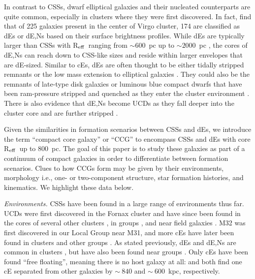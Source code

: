 \documentclass[iop,apj]{emulateapj}
\newcommand{\Reff}{R$_{\rm eff}$}
\begin{document}
In contrast to CSSs, dwarf elliptical galaxies \citep[dEs;][]{Sandage1985} and their nucleated counterparts \citep[dE,Ns;][]{Binggeli1984} are quite common, especially in clusters where they were first discovered. In fact, \citet{Binggeli1991} find that of 225 galaxies present in the center of Virgo cluster, 174 are classified as dEs or dE,Ns based on their surface brightness profiles. While dEs are typically larger than CSSs with \Reff\ ranging from $\sim600$~pc up to $\sim2000$~pc \citep[e.g.,][]{Norris2014}, the cores of dE,Ns can reach down to CSS-like sizes and reside within larger envelopes that are dE-sized. Similar to cEs, dEs are often thought to be either tidally stripped remnants \citep{Crnojevic2014} or the low mass extension to elliptical galaxies \citep{Kormendy2012a}. They could also be the remnants of late-type disk galaxies or luminous blue compact dwarfs that have been ram-pressure stripped and quenched as they enter the cluster environment \citep{Lisker2013, Crawford2016a}. There is also evidence that dE,Ns become UCDs as they fall deeper into the cluster core and are further stripped \citep{Pfeffer2013,Zhang2015,Liu2015}.

Given the similarities in formation scenarios between CSSs and dEs, we introduce the term ``compact core galaxy'' or ``CCG'' to encompass CSSs and dEs with core \Reff\ up to 800~pc. The goal of this paper is to study these galaxies as part of a continuum of compact galaxies in order to differentiate between formation scenarios. Clues to how CCGs form may be given by their environments,  morphology i.e., one- or two-component structure, star formation histories, and kinematics. We highlight these data below.

\textit{Environments.} CSSs have been found in a large range of environments thus far. UCDs were first discovered in the Fornax cluster \citep{Hilker1999, Drinkwater2000} and have since been found in the cores of several other clusters \citep{Price2009,Madrid2010,Jones2006,Mieske2009,Misgeld2008}, in groups \citep{Evstigneeva2007}, and near field galaxies \citep{Hau2009,Norris2011}. M32 was first discovered in our Local Group \citep{Faber1973} near M31, and more cEs have later been found in clusters \citep{Chilingarian2007,SmithCastelli2012,Price2009} and other groups \citep{Huxor2011,Chilingarian2010}. As stated previously, dEs and dE,Ns are common in clusters \citep{SmithCastelli2012,Koo1994,Guzman1996,Crawford2016a}, but have also been found near groups \citep{Crnojevic2014,Penny2014}. Only cEs have been found ``free floating'', meaning there is no host galaxy at all: \citet{Huxor2013} and \citet{Paudel2014} both find one cE separated from other galaxies by $\sim~840$ and $\sim~600$~kpc, respectively. 
\end{document}
